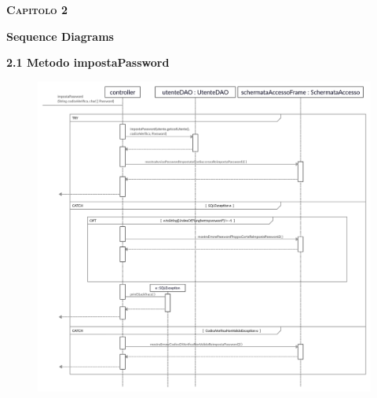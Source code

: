 \documentclass[a4paper,12pt]{article}
\begin{document}
\newpage\null{}\setcounter{page}{5}
\begin{flushleft}
\Large\textsc{\bf Capitolo 2}
\vspace*{+1cm}

\begingroup
\fontsize{35pt}{12pt}\selectfont\bf{Sequence Diagrams}
\endgroup
\vspace*{+1cm}

\vspace*{+2cm}
{\bf\normalsize 2.1 Metodo impostaPassword }
\begin{center}
	\begin{figure}[h]
	\centering
 	\includegraphics[width=1\textwidth]{impostaPassword.jpg}
	\end{figure}
\end{center}
\end{flushleft}
\newpage
\end{document}
